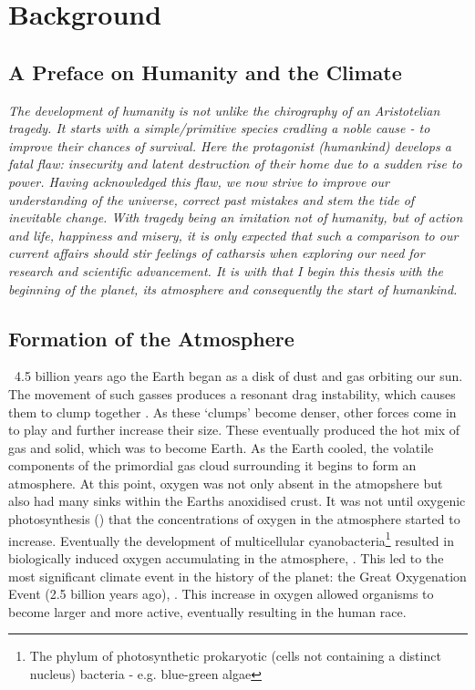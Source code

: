 \section{Background}
\subsection{A Preface on Humanity and the Climate}
\begin{flushleft}\emph{
The development of humanity is not unlike the chirography of an Aristotelian tragedy. It starts with a simple/primitive species cradling a noble cause - to improve their chances of survival. Here the protagonist (humankind) develops a fatal flaw: insecurity and latent destruction of their home due to a sudden rise to power.
Having acknowledged this flaw, we now strive to improve our understanding of the universe, correct past mistakes and stem the tide of inevitable change. \vspace{\baselineskip}\linebreak
With tragedy being an imitation not of humanity, but of action and life, happiness and misery, it is only expected that such a comparison to our current affairs should stir feelings of catharsis when exploring our need for research and scientific advancement.
It is with that I begin this thesis with the beginning of the planet, its atmosphere and consequently the start of humankind.
}
\end{flushleft}


\subsection{Formation of the Atmosphere}
 ~4.5 billion years ago the Earth began as a disk of dust and gas orbiting our sun. The movement of such gasses produces a resonant drag instability, which causes them to clump together \citep{drag,planet}. As these `clumps' become denser, other forces come in to play and further increase their size. These eventually produced the hot mix of gas and solid, which was to become Earth.
 As the Earth cooled, the volatile components of the primordial gas cloud surrounding it begins to form an atmosphere. %
At this point, oxygen was not only absent in the atmopshere but also had many sinks within the Earths anoxidised crust. It was not until oxygenic photosynthesis (\citep{oxygenicphotosynthesis}) that the concentrations of oxygen in the atmosphere started to increase. Eventually the development of multicellular cyanobacteria\footnote{The phylum of photosynthetic prokaryotic (cells not containing a distinct nucleus) bacteria - e.g. blue-green algae} resulted in biologically induced oxygen accumulating in the atmosphere, \citep{multicellular}. This led to the most significant climate event in the history of the planet: the Great Oxygenation Event (2.5 billion years ago), \citep{oxidation}. This increase in oxygen allowed organisms to become larger and more active, eventually resulting in the human race.


